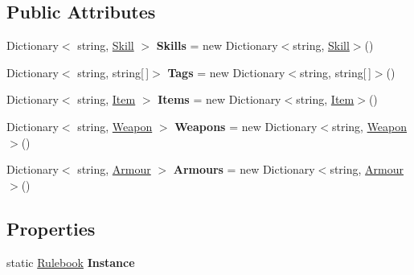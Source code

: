 \subsection*{Public Attributes}
\begin{DoxyCompactItemize}
\item 
\hypertarget{class_dungeon_crawler_1_1_core_1_1_rulebook_afff9e91efa6e6581f7b02b4baeb5e756}{}Dictionary$<$ string, \hyperlink{class_dungeon_crawler_1_1_core_1_1_skill}{Skill} $>$ {\bfseries Skills} = new Dictionary$<$string, \hyperlink{class_dungeon_crawler_1_1_core_1_1_skill}{Skill}$>$()\label{class_dungeon_crawler_1_1_core_1_1_rulebook_afff9e91efa6e6581f7b02b4baeb5e756}

\item 
\hypertarget{class_dungeon_crawler_1_1_core_1_1_rulebook_acd5fb3739084cde354ae4d729354fbe3}{}Dictionary$<$ string, string\mbox{[}$\,$\mbox{]}$>$ {\bfseries Tags} = new Dictionary$<$string, string\mbox{[}$\,$\mbox{]}$>$()\label{class_dungeon_crawler_1_1_core_1_1_rulebook_acd5fb3739084cde354ae4d729354fbe3}

\item 
\hypertarget{class_dungeon_crawler_1_1_core_1_1_rulebook_acd31a8ebfcea393eb1f191fbc22629ed}{}Dictionary$<$ string, \hyperlink{class_dungeon_crawler_1_1_core_1_1_item}{Item} $>$ {\bfseries Items} = new Dictionary$<$string, \hyperlink{class_dungeon_crawler_1_1_core_1_1_item}{Item}$>$()\label{class_dungeon_crawler_1_1_core_1_1_rulebook_acd31a8ebfcea393eb1f191fbc22629ed}

\item 
\hypertarget{class_dungeon_crawler_1_1_core_1_1_rulebook_a14a19b374fbdb5d0d09b222954fcbddc}{}Dictionary$<$ string, \hyperlink{class_dungeon_crawler_1_1_core_1_1_weapon}{Weapon} $>$ {\bfseries Weapons} = new Dictionary$<$string, \hyperlink{class_dungeon_crawler_1_1_core_1_1_weapon}{Weapon}$>$()\label{class_dungeon_crawler_1_1_core_1_1_rulebook_a14a19b374fbdb5d0d09b222954fcbddc}

\item 
\hypertarget{class_dungeon_crawler_1_1_core_1_1_rulebook_a2035a1cee51642a79a1e3cc653188a18}{}Dictionary$<$ string, \hyperlink{class_dungeon_crawler_1_1_core_1_1_armour}{Armour} $>$ {\bfseries Armours} = new Dictionary$<$string, \hyperlink{class_dungeon_crawler_1_1_core_1_1_armour}{Armour}$>$()\label{class_dungeon_crawler_1_1_core_1_1_rulebook_a2035a1cee51642a79a1e3cc653188a18}

\end{DoxyCompactItemize}
\subsection*{Properties}
\begin{DoxyCompactItemize}
\item 
\hypertarget{class_dungeon_crawler_1_1_core_1_1_rulebook_a113e93268afaa03eb3d7c0ce9ef284e7}{}static \hyperlink{class_dungeon_crawler_1_1_core_1_1_rulebook}{Rulebook} {\bfseries Instance}\label{class_dungeon_crawler_1_1_core_1_1_rulebook_a113e93268afaa03eb3d7c0ce9ef284e7}

\end{DoxyCompactItemize}


